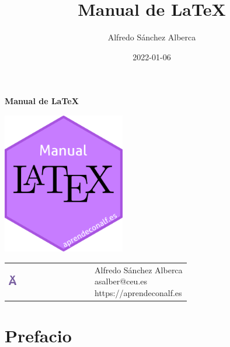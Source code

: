 \documentclass[
  a4paper,
]{scrreport}
\title{Manual de LaTeX}
\author{Alfredo Sánchez Alberca}
\date{2022-01-06}
\renewcommand*\contentsname{Tabla de contenidos}
\newcommand\contentsname{Tabla de contenidos}
\theoremstyle{definition}
\theoremstyle{remark}
\begin{document}
\begin{titlepage}

\begin{center}
\vspace*{5cm}

\Huge
{\textbf{\textsf{Manual de LaTeX}}}

\vspace{0.5cm}
\LARGE
{\textbf{\textsf{}}}

\vspace{1.5cm}

\includegraphics[width=0.4\textwidth]{img/logos/sticker.png}
\end{center}

\vfill

\begin{flushleft}
\begin{tabular}{ll}
\includegraphics[width=0.1\textwidth]{img/logos/aprendeconalf.png} & \parbox[b]{5cm}{\Large\textsf{Alfredo
Sánchez
Alberca}\\ \textsf{asalber@ceu.es} \\ \textsf{https://aprendeconalf.es}}
\end{tabular}
\end{flushleft}
\end{titlepage}
\renewcommand*\contentsname{Tabla de contenidos}
{
\hypersetup{linkcolor=}
\setcounter{tocdepth}{2}
\tableofcontents
}


\chapter*{Prefacio}\label{prefacio}
\end{document}
